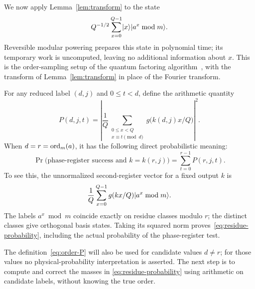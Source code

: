 We now apply Lemma~\ref{lem:transform} to the state
\[
 Q^{-1/2}\sum_{x=0}^{Q-1}\lvert x\rangle\lvert a^x\bmod m\rangle.
\]
Reversible modular powering prepares this state in polynomial time;
its temporary work is uncomputed, leaving no additional information
about $x$.  This is the order-sampling setup of the quantum factoring
algorithm~\cite{Shor}, with the transform of Lemma~\ref{lem:transform}
in place of the Fourier transform.

For any reduced label $(d,j)$ and $0\le t<d$, define the arithmetic
quantity
\begin{equation}\label{eq:order-P}
 P(d,j,t)=\left|\frac1Q
       \sum_{\substack{0\le x<Q\\x\equiv t\pmod d}}
            g\bigl(k(d,j)x/Q\bigr)\right|^2.
\end{equation}
When $d=r=\operatorname{ord}_m(a)$, it has the following direct probabilistic meaning:
\begin{equation}\label{eq:residue-probability}
 \Pr\bigl(\text{phase-register success and }k=k(r,j)\bigr)
       =\sum_{t=0}^{r-1}P(r,j,t).
\end{equation}
To see this, the unnormalized second-register vector for a fixed output
$k$ is
\[
 \frac1Q\sum_{x=0}^{Q-1}g(kx/Q)\lvert a^x\bmod m\rangle.
\]
The labels $a^x\bmod m$ coincide exactly on residue classes modulo $r$;
the distinct classes give orthogonal basis states.  Taking its squared
norm proves~\eqref{eq:residue-probability}, including the actual
probability of the phase-register test.

The definition~\eqref{eq:order-P} will also be used for candidate
values $d\ne r$; for those values no physical-probability interpretation
is asserted.  The next step is to compute and correct the masses in
\eqref{eq:residue-probability} using arithmetic on candidate labels,
without knowing the true order.
